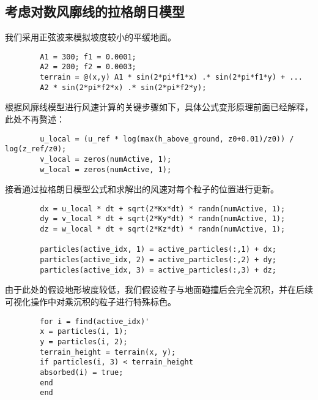 \documentclass{article}
\begin{document}
	\subsection{考虑对数风廓线的拉格朗日模型}
	我们采用正弦波来模拟坡度较小的平缓地面。
	\begin{lstlisting}
		A1 = 300; f1 = 0.0001;   
		A2 = 200; f2 = 0.0003;  
		terrain = @(x,y) A1 * sin(2*pi*f1*x) .* sin(2*pi*f1*y) + ...
		A2 * sin(2*pi*f2*x) .* sin(2*pi*f2*y);\end{lstlisting}
	\indent 根据风廓线模型进行风速计算的关键步骤如下，具体公式变形原理前面已经解释，此处不再赘述：
	\begin{lstlisting}
		u_local = (u_ref * log(max(h_above_ground, z0+0.01)/z0)) / log(z_ref/z0);
		v_local = zeros(numActive, 1);
		w_local = zeros(numActive, 1);\end{lstlisting}
	\indent 接着通过拉格朗日模型公式和求解出的风速对每个粒子的位置进行更新。
	\begin{lstlisting}
		dx = u_local * dt + sqrt(2*Kx*dt) * randn(numActive, 1);
		dy = v_local * dt + sqrt(2*Ky*dt) * randn(numActive, 1);
		dz = w_local * dt + sqrt(2*Kz*dt) * randn(numActive, 1);
		
		particles(active_idx, 1) = active_particles(:,1) + dx;
		particles(active_idx, 2) = active_particles(:,2) + dy;
		particles(active_idx, 3) = active_particles(:,3) + dz;\end{lstlisting}
	\indent 由于此处的假设地形坡度较低，我们假设粒子与地面碰撞后会完全沉积，并在后续可视化操作中对乘沉积的粒子进行特殊标色。
	\begin{lstlisting}
		for i = find(active_idx)'
		x = particles(i, 1);
		y = particles(i, 2);
		terrain_height = terrain(x, y);
		if particles(i, 3) < terrain_height
		absorbed(i) = true;
		end
		end\end{lstlisting}
\end{document}
